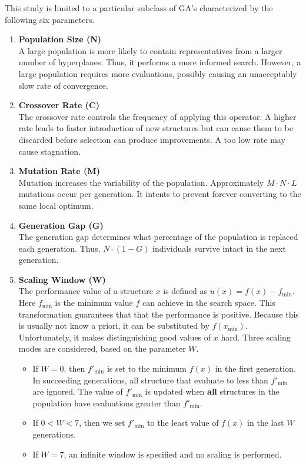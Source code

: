 \documentclass[../main.tex]{subfiles}
\begin{document}
This study is limited to a particular subclass of GA's characterized by the following six parameters.

\begin{enumerate}
	\item \textbf{Population Size (N)} \\
	A large population is more likely to contain representatives from a larger number of hyperplanes. Thus, it performs
	a more informed search. However, a large population requires more evaluations, possibly causing an unacceptably slow
	rate of convergence.

	\item \textbf{Crossover Rate (C)} \\
	The crossover rate controls the frequency of applying this operator. A higher rate leads to faster introduction of
	new structures but can cause them to be discarded before selection can produce improvements. A too low rate may
	cause stagnation.

	\item \textbf{Mutation Rate (M)} \\
	Mutation increases the variability of the population. Approximately $M \cdot N \cdot L$ mutations occur per
	generation. It intents to prevent forever converting to the same local optimum.

	\item \textbf{Generation Gap (G)} \\
	The generation gap determines what percentage of the population is replaced each generation. Thus, $N \cdot (1-G)$
	individuals survive intact in the next generation.

	\item \textbf{Scaling Window (W)} \\
	The performance value of a structure $x$ is defined as $u(x) = f(x) - f_{\text{min}}$. Here $f_{\text{min}}$ is the
	minimum value $f$ can achieve in the search space. This transformation guarantees that that the performance is
	positive. Because this is usually not know a priori, it can be substituted by $f(x_{\text{min}})$. Unfortunately,
	it makes distinguishing good values of $x$ hard. Three scaling modes are considered, based on the parameter $W$.

	\begin{itemize}
		\item If $W = 0$, then $f'_{\text{min}}$ is set to the minimum $f(x)$ in the first generation. In succeeding
		generations, all structure that evaluate to less than $f'_{\text{min}}$  are ignored. The value of
		$f'_{\text{min}}$ is updated when \textbf{all} structures in the population have evaluations greater than
		$f'_{\text{min}}$.
		\item If $0 < W < 7$, then we set $f'_{\text{min}}$ to the least value of $f(x)$ in the last $W$ generations.
		\item If $W = 7$, an infinite window is specified and no scaling is performed.
	\end{itemize}


\end{enumerate}
\end{document}
